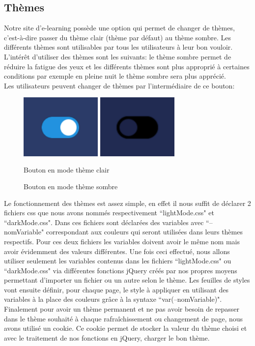 \documentclass[a4paper,11pt]{article}
\begin{document}
\subsection{Thèmes}
Notre site d'e-learning possède une option qui permet de changer de thèmes, c'est-à-dire passer du thème clair (thème par défaut) au thème sombre. Les différents thèmes sont utilisables par tous les utilisateurs à leur bon vouloir. L'intérêt d'utiliser des thèmes sont les suivants: le thème sombre permet de réduire la fatigue des yeux et les différents thèmes sont plus approprié à certaines conditions par exemple en pleine nuit le thème sombre sera plus apprécié.\\

Les utilisateurs peuvent changer de thèmes par l'intermédiaire de ce bouton:
\begin{figure}[!h]
\centerline{
    \includegraphics[width=4cm]{images/boutonThemeClaire.PNG}
    \includegraphics[width=4cm]{images/boutonThemeSombre.PNG}
}
\caption{Bouton en mode thème clair}
\caption{Bouton en mode thème sombre}
\label{fig}
\end{figure}

Le fonctionnement des thèmes est assez simple, en effet il nous suffit de déclarer 2 fichiers css que nous avons nommés respectivement ``lightMode.css" et ``darkMode.css". Dans ces fichiers sont déclarées des variables avec ``--nomVariable" correspondant aux couleurs qui seront utilisées dans leurs thèmes respectifs. Pour ces deux fichiers les variables doivent avoir le même nom mais avoir évidemment des valeurs différentes. Une fois ceci effectué, nous allons utiliser seulement les variables contenus dans les fichiers ``lightMode.css" ou ``darkMode.css" via différentes fonctions jQuery créés par nos propres moyens permettant d'importer un fichier ou un autre selon le thème. Les feuilles de styles vont ensuite définir, pour chaque page, le style à appliquer en utilisant des variables à la place des couleurs grâce à la syntaxe ``var(--nomVariable)". Finalement pour avoir un thème permanent et ne pas avoir besoin de repasser dans le thème souhaité à chaque rafraîchissement ou changement de page, nous avons utilisé un cookie. Ce cookie permet de stocker la valeur du thème choisi et avec le traitement de nos fonctions en jQuery, charger le bon thème.\\
\end{document}
